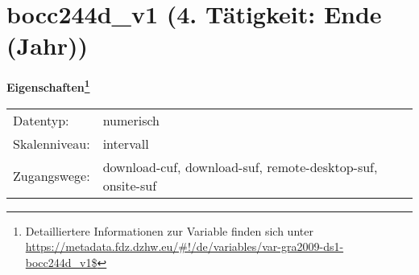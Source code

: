 
    \setcounter{footnote}{0}

    \vspace*{-1.8cm}
	\section{bocc244d\_v1 (4. Tätigkeit: Ende (Jahr))}
	\label{section:bocc244d_v1}



    \vspace*{0.5cm}
    \noindent\textbf{Eigenschaften\footnote{Detailliertere Informationen zur Variable finden sich unter
		\url{https://metadata.fdz.dzhw.eu/\#!/de/variables/var-gra2009-ds1-bocc244d_v1$}}}\\
	\begin{tabularx}{\hsize}{@{}lX}
	Datentyp: & numerisch \\
	Skalenniveau: & intervall \\
	Zugangswege: &
	  download-cuf, 
	  download-suf, 
	  remote-desktop-suf, 
	  onsite-suf
 \\
    \end{tabularx}



